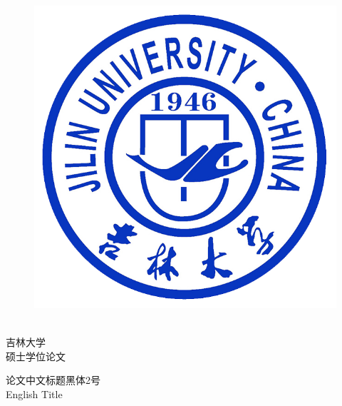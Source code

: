 \documentclass[UTF8]{ctexart}
\begin{document}
	\begin{center}
		\begin{figure}[h]
			\centerline{\includegraphics[scale=1.0]{./jlu.png}}
		\end{figure}
	\end{center}
	\begin{center}
		\quad \\
		\lishu \fontsize{45}{17} 吉\quad 林\quad 大\quad 学\\
		\lishu \fontsize{45}{17}硕\quad 士\quad 学\quad 位\quad 论\quad 文
		
		\vskip 1.5cm
		\heiti {} 论文中文标题黑体2号\\
		\rmfamily {} English Title 
	\end{center}

	\vskip 1.5cm
\end{document}
